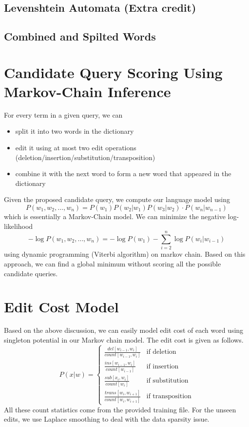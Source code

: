 \subsection{Levenshtein Automata (Extra credit)}

\subsection{Combined and Spilted Words}


\section{Candidate Query Scoring Using Markov-Chain Inference}
For every term in a given query, we can
\begin{itemize}
  \item split it into two words in the dictionary
  \item edit it using at most two edit operations (deletion/insertion/substitution/transposition)
  \item combine it with the next word to form a new word that appeared in the dictionary 
\end{itemize}
Given the proposed candidate query, we compute our language model using
\begin{equation}\label{eq:3}
P(w_1, w_2, \dots, w_n) = P(w_1) P(w_2 | w_1) P(w_3 | w_2) \cdot P(w_n | w_{n-1})
\end{equation}
which is essentially a Markov-Chain model. We can minimize the negative log-likelihood
\begin{equation}\label{eq:4}
-\log P(w_1, w_2, \dots, w_n) = -\log P(w_1) - \sum_{i=2}^n \log P(w_i | w_{i-1})
\end{equation}
using dynamic programming (Viterbi algorithm) on markov chain. Based on this approach,
we can find a global minimum without scoring all the possible candidate queries.


\section{Edit Cost Model}
Based on the above discussion, we can easily model edit cost of each word using singleton potential in our Markov chain model. The edit cost is given as follows.
\begin{equation}\label{eq:5}
P(x | w) = \left\{\begin{array}{ll}
\frac{del[w_{i-1}, w_i]}{count[w_{i-1}, w_i]} & \textrm{if deletion} \\
\frac{ins[w_{i-1}, w_i]}{count[w_{i-1}]} & \textrm{if insertion} \\
\frac{sub[x_i, w_i]}{count[w_i]} & \textrm{if substitution} \\
\frac{trans[w_i, w_{i+1}]}{count[w_i, w_{i+1}]} & \textrm{if transposition}
\end{array}\right.
\end{equation}
All these count statistics come from the provided training file. For the unseen edits, we use Laplace smoothing to deal with the data sparsity issue.

